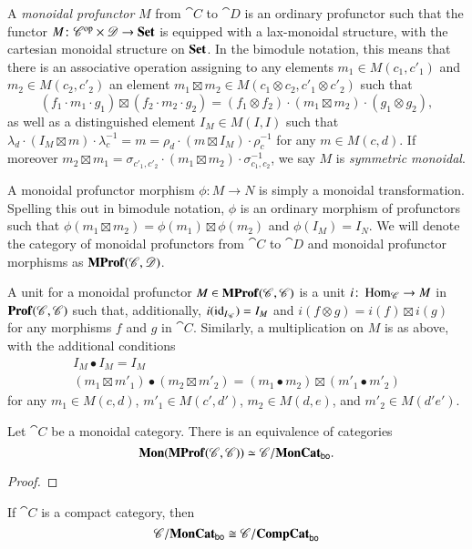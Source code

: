 \documentclass[12pt,oneside,article,draft]{memoir}
\begin{document}
A \emph{monoidal profunctor} $M$ from $\cat{C}$ to $\cat{D}$ is an ordinary profunctor such that the functor $M\colon {\mathscr{C}}^{\text{op}}\times\mathscr{D}\to\mathbf{Set}$ is equipped with a lax-monoidal structure, with the cartesian monoidal structure on $\mathbf{Set}$. In the bimodule notation, this means that there is an associative operation assigning to any elements $m_1\in M(c_1,c'_1)$ and $m_2\in M(c_2,c'_2)$ an element $m_1\boxtimes m_2\in M(c_1\otimes c_2,c'_1\otimes c'_2)$ such that
\[
	(f_1\cdot m_1\cdot g_1)\boxtimes(f_2\cdot m_2\cdot g_2) = (f_1\otimes f_2)\cdot(m_1\boxtimes m_2)\cdot(g_1\otimes g_2),
\]
as well as a distinguished element $I_M\in M(I,I)$ such that $\lambda_d\cdot(I_M\boxtimes m)\cdot\lambda^{-1}_c = m = \rho_d\cdot(m\boxtimes I_M)\cdot\rho^{-1}_c$ for any $m\in M(c,d)$. If moreover $m_2\boxtimes m_1 = \sigma_{c'_1,c'_2}\cdot(m_1\boxtimes m_2)\cdot\sigma_{c_1,c_2}^{-1}$, we say $M$ is \emph{symmetric monoidal}.

A monoidal profunctor morphism $\phi\colon M\to N$ is simply a monoidal transformation. Spelling this out in bimodule notation, $\phi$ is an ordinary morphism of profunctors such that $\phi(m_1\boxtimes m_2)=\phi(m_1)\boxtimes\phi(m_2)$ and $\phi(I_M)=I_N$. We will denote the category of monoidal profunctors from $\cat{C}$ to $\cat{D}$ and monoidal profunctor morphisms as $\mathbf{MProf}(\mathscr{C},\mathscr{D})$. 

A unit for a monoidal profunctor $M\in\mathbf{MProf}(\mathscr{C},\mathscr{C})$ is a unit $i\colon\operatorname{Hom}_{\mathscr{C}}\to M$ in $\mathbf{Prof}(\mathscr{C},\mathscr{C})$ such that, additionally, $i(\operatorname{id}_{I_{\mathscr{C}}})=I_M$ and $i(f\otimes g)=i(f)\boxtimes i(g)$ for any morphisms $f$ and $g$ in $\cat{C}$. Similarly, a multiplication on $M$ is as above, with the additional conditions
\begin{gather*}
	I_M\bullet I_M=I_M \\
	(m_1\boxtimes m'_1)\bullet(m_2\boxtimes m'_2) = (m_1\bullet m_2)\boxtimes(m'_1\bullet m'_2)
\end{gather*}
for any $m_1\in M(c,d)$, $m'_1\in M(c',d')$, $m_2\in M(d,e)$, and $m'_2\in M(d'e')$.

\begin{lemma}\label{Lem:mon profs equal boo functors}
	Let $\cat{C}$ be a monoidal category. There is an equivalence of categories 
\[
\mathbf{Mon}(\mathbf{MProf}(\mathscr{C},\mathscr{C}))\simeq \mathscr{C}/\mathbf{MonCat}_{\mathsf{bo}}.
\]
\begin{proof}


\end{proof}


\begin{lemma}\label{lemma:easy compcat}

If $\cat{C}$ is a compact category, then
\[
  \mathscr{C}/\mathbf{MonCat}_{\mathsf{bo}}\cong\mathscr{C}/\mathbf{CompCat}_{\mathsf{bo}}
\]
\end{lemma}


\end{lemma}
\end{document}
